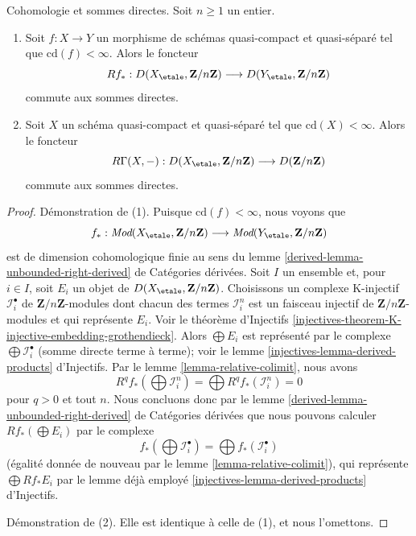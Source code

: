 \begin{lemma}
\label{lemma-finite-cd-mod-n-direct-sums}
Cohomologie et sommes directes. Soit $n \geq 1$ un entier.
\begin{enumerate}
\item Soit $f : X \to Y$ un morphisme de schémas quasi-compact et
quasi-séparé tel que $\text{cd}(f) < \infty$. Alors le foncteur
$$
Rf_* :
D(X_\etale, \mathbf{Z}/n\mathbf{Z})
\longrightarrow
D(Y_\etale, \mathbf{Z}/n\mathbf{Z})
$$
commute aux sommes directes.
\item Soit $X$ un schéma quasi-compact et quasi-séparé tel que
$\text{cd}(X) < \infty$. Alors le foncteur
$$
R\Gamma(X, -) :
D(X_\etale, \mathbf{Z}/n\mathbf{Z})
\longrightarrow
D(\mathbf{Z}/n\mathbf{Z})
$$
commute aux sommes directes.
\end{enumerate}
\end{lemma}

\begin{proof}
Démonstration de (1). Puisque $\text{cd}(f) < \infty$, nous voyons que
$$
f_* :
\textit{Mod}(X_\etale, \mathbf{Z}/n\mathbf{Z})
\longrightarrow
\textit{Mod}(Y_\etale, \mathbf{Z}/n\mathbf{Z})
$$
est de dimension cohomologique finie au sens du
lemme \ref{derived-lemma-unbounded-right-derived} de Catégories dérivées.
Soit $I$ un ensemble et, pour $i \in I$, soit $E_i$
un objet de $D(X_\etale, \mathbf{Z}/n\mathbf{Z})$.
Choisissons un complexe K-injectif $\mathcal{I}_i^\bullet$
de $\mathbf{Z}/n\mathbf{Z}$-modules dont chacun des
termes $\mathcal{I}_i^n$ est un faisceau injectif de
$\mathbf{Z}/n\mathbf{Z}$-modules et qui représente $E_i$.
Voir le théorème d'Injectifs
\ref{injectives-theorem-K-injective-embedding-grothendieck}.
Alors $\bigoplus E_i$ est représenté par le complexe
$\bigoplus \mathcal{I}_i^\bullet$ (somme directe terme à terme); voir le
lemme \ref{injectives-lemma-derived-products} d'Injectifs.
Par le lemme \ref{lemma-relative-colimit}, nous avons
$$
R^qf_*(\bigoplus \mathcal{I}_i^n) =
\bigoplus R^qf_*(\mathcal{I}_i^n) = 0
$$
pour $q > 0$ et tout $n$. Nous concluons donc par le
lemme \ref{derived-lemma-unbounded-right-derived} de Catégories dérivées
que nous pouvons calculer $Rf_*(\bigoplus E_i)$ par le complexe
$$
f_*(\bigoplus \mathcal{I}_i^\bullet) =
\bigoplus f_*(\mathcal{I}_i^\bullet)
$$
(égalité donnée de nouveau par le lemme \ref{lemma-relative-colimit}), qui
représente $\bigoplus Rf_*E_i$ par le lemme déjà employé
\ref{injectives-lemma-derived-products} d'Injectifs.

\medskip\noindent
Démonstration de (2). Elle est identique à celle de (1),
et nous l'omettons.
\end{proof}

